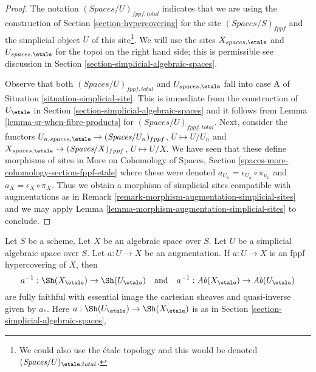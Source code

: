 \begin{proof}
The notation $(\textit{Spaces}/U)_{fppf, total}$ indicates that
we are using the construction of
Section \ref{section-hypercovering}
for the site $(\textit{Spaces}/S)_{fppf}$ and the
simplicial object $U$ of this site\footnote{We could also
use the \'etale topology and this would be denoted
$(\textit{Spaces}/U)_{\etale, total}$.}.
We will use the sites $X_{spaces, \etale}$ and $U_{spaces, \etale}$
for the topoi on the right hand side; this is permissible
see discussion in Section \ref{section-simplicial-algebraic-spaces}.

\medskip\noindent
Observe that both $(\textit{Spaces}/U)_{fppf, total}$ and
$U_{spaces, \etale}$
fall into case A of Situation \ref{situation-simplicial-site}.
This is immediate from the construction of
$U_\etale$ in Section \ref{section-simplicial-algebraic-spaces}
and it follows from Lemma \ref{lemma-sr-when-fibre-products}
for $(\textit{Spaces}/U)_{fppf, total}$.
Next, consider the functors
$U_{n, spaces, \etale} \to (\textit{Spaces}/U_n)_{fppf}$, $U \mapsto U/U_n$
and
$X_{spaces, \etale} \to (\textit{Spaces}/X)_{fppf}$, $U \mapsto U/X$.
We have seen that these define morphisms of sites in
More on Cohomology of Spaces, Section
\ref{spaces-more-cohomology-section-fppf-etale}
where these were denoted $a_{U_n} = \epsilon_{U_n} \circ \pi_{u_n}$
and $a_X = \epsilon_X \circ \pi_X$.
Thus we obtain a morphism of simplicial sites compatible with
augmentations as in Remark \ref{remark-morphism-augmentation-simplicial-sites}
and we may apply
Lemma \ref{lemma-morphism-augmentation-simplicial-sites} to conclude.
\end{proof}

\begin{lemma}
\label{lemma-descent-sheaves-for-fppf-hypercovering}
Let $S$ be a scheme. Let $X$ be an algebraic space over $S$.
Let $U$ be a simplicial algebraic space over $S$. Let $a : U \to X$
be an augmentation. If $a : U \to X$ is an fppf hypercovering of $X$,
then
$$
a^{-1} : \Sh(X_\etale) \to \Sh(U_\etale)
\quad\text{and}\quad
a^{-1} : \textit{Ab}(X_\etale) \to \textit{Ab}(U_\etale)
$$
are fully faithful with essential image the cartesian sheaves and
quasi-inverse given by $a_*$. Here $a : \Sh(U_\etale) \to \Sh(X_\etale)$
is as in Section \ref{section-simplicial-algebraic-spaces}.
\end{lemma}

